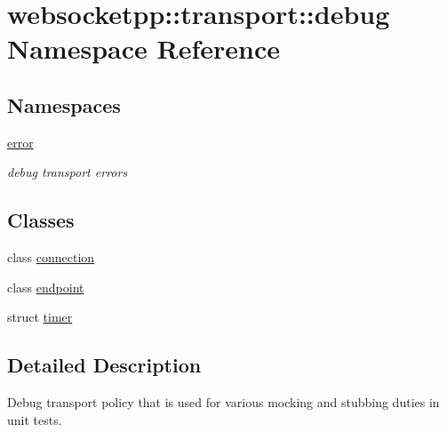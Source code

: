 \hypertarget{namespacewebsocketpp_1_1transport_1_1debug}{}\section{websocketpp\+:\+:transport\+:\+:debug Namespace Reference}
\label{namespacewebsocketpp_1_1transport_1_1debug}
\subsection*{Namespaces}
\begin{DoxyCompactItemize}
\item 
 \mbox{\hyperlink{namespacewebsocketpp_1_1transport_1_1debug_1_1error}{error}}
\begin{DoxyCompactList}\small\item\em debug transport errors \end{DoxyCompactList}\end{DoxyCompactItemize}
\subsection*{Classes}
\begin{DoxyCompactItemize}
\item 
class \mbox{\hyperlink{classwebsocketpp_1_1transport_1_1debug_1_1connection}{connection}}
\item 
class \mbox{\hyperlink{classwebsocketpp_1_1transport_1_1debug_1_1endpoint}{endpoint}}
\item 
struct \mbox{\hyperlink{structwebsocketpp_1_1transport_1_1debug_1_1timer}{timer}}
\end{DoxyCompactItemize}


\subsection{Detailed Description}
Debug transport policy that is used for various mocking and stubbing duties in unit tests. 